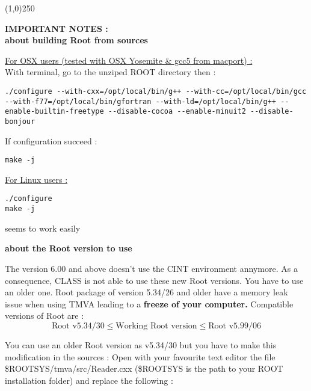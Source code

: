 \begin{center}
\line(1,0){250}
\end{center}

\begin{large}
\begin{center}
\textbf{IMPORTANT NOTES : } \\
\vspace{0.5cm}
\textbf{about building Root from sources} \\
\end{center}
\end{large} 
\underline{For OSX users (tested with OSX Yosemite \& gcc5 from macport) :}\\
With terminal, go to the unziped ROOT directory then :
\begin{lstlisting}[style=terminal]
./configure --with-cxx=/opt/local/bin/g++ --with-cc=/opt/local/bin/gcc --with-f77=/opt/local/bin/gfortran --with-ld=/opt/local/bin/g++ --enable-builtin-freetype --disable-cocoa --enable-minuit2 --disable-bonjour
\end{lstlisting}
If configuration succeed :
\begin{lstlisting}[style=terminal]
make -j
\end{lstlisting}
\vspace{0.5cm}
\underline{For Linux users :}\\
\begin{lstlisting}[style=terminal]
./configure 
make -j
\end{lstlisting}
seems to work easily
\vspace{1cm}

\begin{large}
\begin{center}
\textbf{about the Root version to use} \\
\end{center}
\end{large} 

The version 6.00 and above doesn't use the CINT environment annymore. As a consequence, CLASS is not able to use these new Root versions. You have to use an older one.
Root package of version 5.34/26 and older have a memory leak issue when using TMVA leading to a \textbf{freeze of your computer.}
Compatible versions of Root are : 
\begin{equation}
\text{Root v5.34/30} \leq \text{Working Root version} \leq \text{Root v5.99/06}
\end{equation}

You can use an older Root version as v5.34/30 but you have to make this modification in the sources :
Open with your favourite text editor the file  \$ROOTSYS/tmva/src/Reader.cxx (\$ROOTSYS is the path to your ROOT installation folder) and replace the following :\\


